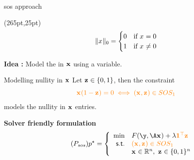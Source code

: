 \documentclass[10pt]{beamer}
\begin{document}
\begin{frame}{\gls{sos} approach}
  
  \begin{textblock*}{100pt}(265pt,25pt)
    \scriptsize{
      \begin{equation}
        \nonumber
        \|x_{}\|_0 =
        \begin{cases}
          0 &\text{if} \ x_{} = 0 \\
          1 &\text{if} \ x_{} \neq 0
        \end{cases}
      \end{equation}
    }
  \end{textblock*}

  \textbf{Idea :} Model the  in $\pv$ using a  variable.
  \pause
  \vspace*{0.5cm}
  \begin{block}{Modelling nullity in $\pv$}
    Let $\bv \in \{0,1\}$, then the constraint
    \begin{equation}
      \emphone{\pv(1-\bv) = 0 \iff (\pv,\bv) \in SOS_1} \nonumber
    \end{equation}
    models the nullity in $\pv$ entries.
  \end{block}
  \pause
  \textbf{Solver friendly formulation}
  \begin{equation}
    \label{prob:prob-SOS} 
    \tag{\(\ppb_{sos}\)}
    \optobj = \left\{
      \begin{array}{rl}
        \min & \datafunc(\obs,\dic\pv) + \reg \emphone{\transp{\1}\bv} \\ 
        \st & \emphone{(\pv,\bv) \in SOS_1} \\ & \pv \in \kR^{\pdim}, \ \bv \in \{0,1\}^{\pdim}
      \end{array}
    \right.
  \end{equation}
\end{frame}
\end{document}
